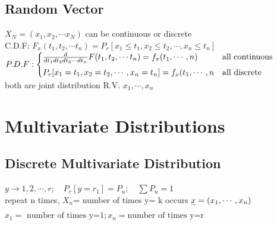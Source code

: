 \documentclass{article}
\begin{document}
\subsection{Random Vector}        
	$X_N=(x_1, x_2, \cdots x_N)$ can be continuous or discrete
	\\C.D.F: $F_x(t_1, t_2, \cdots t_n)= P_r[x_1\le t_1,x_2\le t_2, \cdots, x_n\le t_n]$
	\\$P.D.F: \begin{cases}
	\frac{d}{dt_1 dt_2 dt_3 \cdots dt_n} F(t_1, t_2, \cdots t_n)= f_{\uwave{x}}(t_1, \cdots, n) & \text{all continuous}\\
	P_r[x_1= t_1,x_2= t_2, \cdots, x_n=  t_n]=f_{x}(t_1, \cdots, n &\text{all discrete}  \end{cases}$
	\\both are joint distribution R.V. $x_1, \cdots, x_n$		


\section{Multivariate Distributions} 

\subsection{Discrete Multivariate Distribution}
$ y\rightarrow 1, 2, \cdots, r; \quad P_r[y=r_1]=P_u; \quad \sum P_u= 1$
\\repeat n times, $X_n$= number of times y= k occurs 
$\uwave{x}= (x_1, \cdots, x_n)$
$x_1= \text{ number of times y=1}; x_n= \text{number of times y=r}$
\end{document}
